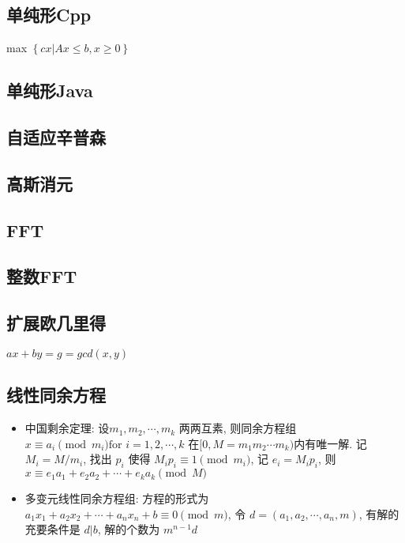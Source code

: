 \documentclass[landscape, twocolumn, 8pt, a4paper, twoside]{extarticle}
\begin{document}
\subsection{单纯形Cpp}
max $\left \{ cx | Ax \le b, x \ge 0 \right \}$


\subsection{单纯形Java}


\subsection{自适应辛普森}


\subsection{高斯消元}


\subsection{FFT}


\subsection{整数FFT}


\subsection{扩展欧几里得}
$ax + by = g = gcd(x, y)$


\subsection{线性同余方程}
\begin{itemize}
\item 中国剩余定理:
  设$m_1, m_2, \cdots, m_k$ 两两互素, 则同余方程组 $x \equiv a_i \pmod{m_i} \textrm{for $i = 1, 2, \cdots, k$}$
  在$[0, M = m_1 m_2 \cdots m_k)$内有唯一解. 
  记 $M_i = M / m_i$,
  找出 $p_i$ 使得 $M_i p_i \equiv 1 \pmod{m_i}$,
  记 $e_i = M_i p_i$,
  则 $x \equiv e_1 a_1 + e_2 a_2 + \cdots + e_k a_k \pmod{M}$
\item 多变元线性同余方程组:
  方程的形式为 $a_1 x_1 + a_2 x_2 + \cdots + a_n x_n + b \equiv 0 \pmod{m}$,
  令 $d = (a_1, a_2, \cdots, a_n, m)$,
  有解的充要条件是 $d | b$, 解的个数为 $m^{n - 1} d$
\end{itemize}
\end{document}
